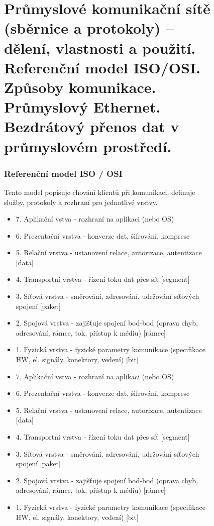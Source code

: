 \begin{figure}[h]
\section{Průmyslové komunikační sítě (sběrnice a protokoly) – dělení, vlastnosti a použití. Referenční model ISO/OSI. Způsoby komunikace. Průmyslový Ethernet. Bezdrátový přenos dat v průmyslovém prostředí.}
\subsubsection*{Referenční model ISO / OSI}
Tento model popisuje chování klientů při komunikaci, definuje služby, protokoly a rozhraní pro jednotlivé vrstvy.
\begin{itemize}
  \item 7. Aplikační vstva - rozhraní na aplikaci (nebo OS)
  \item 6. Prezentační vrstva - konverze dat, šifrování, komprese
  \item 5. Relační vrstva - ustanovení relace, autorizace, autentizace [data]
  \item 4. Transportní vrstva - řízení toku dat přes síť [segment] 
  \item 3. Síťová vrstva - směrování, adresování, udržování síťových spojení [paket]
  \item 2. Spojová vrstva - zajišťuje spojení bod-bod (oprava chyb, adresování, rámce, tok, přístup k médiu) [rámec]
  \item 1. Fyzická vrstva - fyzické parametry komunikace (specifikace HW, el. signály, konektory, vedení) [bit]
    \item 7. Aplikační vstva - rozhraní na aplikaci (nebo OS)
    \item 6. Prezentační vrstva - konverze dat, šifrování, komprese
    \item 5. Relační vrstva - ustanovení relace, autorizace, autentizace [data]
    \item 4. Transportní vrstva - řízení toku dat přes síť [segment]
    \item 3. Síťová vrstva - směrování, adresování, udržování síťových spojení [paket]
    \item 2. Spojová vrstva - zajišťuje spojení bod-bod (oprava chyb, adresování, rámce, tok, přístup k médiu) [rámec]
    \item 1. Fyzická vrstva - fyzické parametry komunikace (specifikace HW, el. signály, konektory, vedení) [bit]
\end{itemize}


\end{figure}
